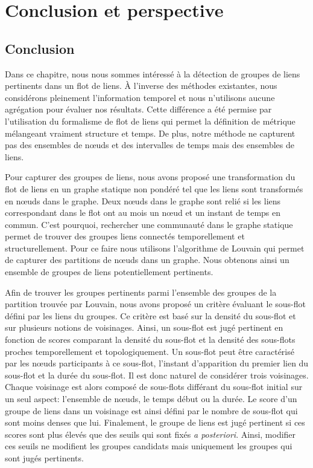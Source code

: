 \section{Conclusion et perspective}
\subsection{Conclusion}

Dans ce chapitre, nous nous sommes intéressé à la détection de groupes de liens pertinents dans un flot de liens.
\`A l'inverse des méthodes existantes, nous considérons pleinement l'information temporel et nous n'utilisons aucune agrégation pour évaluer nos résultats.
Cette différence a été permise par l'utilisation du formalisme de flot de liens qui permet la définition de métrique mélangeant vraiment structure et temps.
De plus, notre méthode ne capturent pas des ensembles de n\oe uds et des intervalles de temps mais des ensembles de liens.

Pour capturer des groupes de liens, nous avons proposé une transformation du flot de liens en un graphe statique non pondéré tel que les liens sont transformés en n\oe uds dans le graphe.
Deux n\oe uds dans le graphe sont relié si les liens correspondant dans le flot ont au mois un n\oe ud et un instant de temps en commun.
C'est pourquoi, rechercher une communauté dans le graphe statique permet de trouver des groupes liens connectés temporellement et structurellement.
Pour ce faire nous utilisons l'algorithme de Louvain qui permet de capturer des partitions de n\oe uds dans un graphe.
Nous obtenons ainsi un ensemble de groupes de liens potentiellement pertinents.

Afin de trouver les groupes pertinents parmi l'ensemble des groupes de la partition trouvée par Louvain, nous avons proposé un critère évaluant le sous-flot défini par les liens du groupes.
Ce critère est basé sur la densité du sous-flot et sur plusieurs notions de voisinages.
Ainsi, un sous-flot est jugé pertinent en fonction de scores comparant la densité du sous-flot et la densité des sous-flots proches temporellement et topologiquement.
Un sous-flot peut être caractérisé par les n\oe uds participants à ce sous-flot, l'instant d'apparition du premier lien du sous-flot et la durée du sous-flot.
Il est donc naturel de considérer trois voisinages.
Chaque voisinage est alors composé de sous-flots différant du sous-flot initial sur un seul aspect: l'ensemble de n\oe uds, le temps début ou la durée.
Le score d'un groupe de liens dans un voisinage est ainsi défini par le nombre de sous-flot qui sont moins denses que lui.
Finalement, le groupe de liens est jugé pertinent si ces scores sont plus élevés que des seuils qui sont fixés \emph{a posteriori}.
Ainsi, modifier ces seuils ne modifient les groupes candidats mais uniquement les groupes qui sont jugés pertinents.



